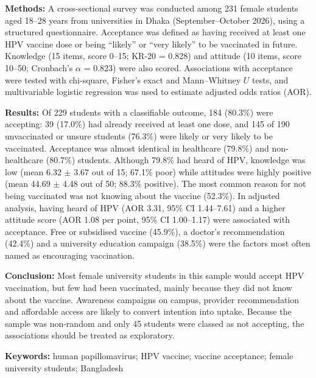 \textbf{Methods:} A cross-sectional survey was conducted among 231 female students aged 18--28 years from universities in Dhaka (September--October 2026), using a structured questionnaire. Acceptance was defined as having received at least one HPV vaccine dose or being ``likely'' or ``very likely'' to be vaccinated in future. Knowledge (15 items, score 0--15; KR-20 = 0.828) and attitude (10 items, score 10--50; Cronbach's $\alpha$ = 0.823) were also scored. Associations with acceptance were tested with chi-square, Fisher's exact and Mann--Whitney $U$ tests, and multivariable logistic regression was used to estimate adjusted odds ratios (AOR).

\textbf{Results:} Of 229 students with a classifiable outcome, 184 (80.3\%) were accepting: 39 (17.0\%) had already received at least one dose, and 145 of 190 unvaccinated or unsure students (76.3\%) were likely or very likely to be vaccinated. Acceptance was almost identical in healthcare (79.8\%) and non-healthcare (80.7\%) students. Although 79.8\% had heard of HPV, knowledge was low (mean 6.32 $\pm$ 3.67 out of 15; 67.1\% poor) while attitudes were highly positive (mean 44.69 $\pm$ 4.48 out of 50; 88.3\% positive). The most common reason for not being vaccinated was not knowing about the vaccine (52.3\%). In adjusted analysis, having heard of HPV (AOR 3.31, 95\% CI 1.44--7.61) and a higher attitude score (AOR 1.08 per point, 95\% CI 1.00--1.17) were associated with acceptance. Free or subsidised vaccine (45.9\%), a doctor's recommendation (42.4\%) and a university education campaign (38.5\%) were the factors most often named as encouraging vaccination.

\textbf{Conclusion:} Most female university students in this sample would accept HPV vaccination, but few had been vaccinated, mainly because they did not know about the vaccine. Awareness campaigns on campus, provider recommendation and affordable access are likely to convert intention into uptake. Because the sample was non-random and only 45 students were classed as not accepting, the associations should be treated as exploratory.

\textbf{Keywords:} human papillomavirus; HPV vaccine; vaccine acceptance; female university students; Bangladesh
\clearpage

\tableofcontents
\clearpage\listoftables{}
\clearpage\listoffigures{}
